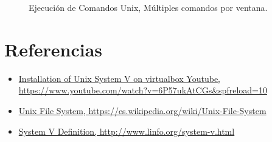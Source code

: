 \documentclass[paper=a4, fontsize=12pt]{article}        %
\numberwithin{equation}{section}                        %
\numberwithin{table}{section}                           %
\begin{document}
\begin{enumerate}
\begin{figure}[H]
{{        }}
       \hfill
    \caption{Ejecución de Comandos Unix, Múltiples comandos por ventana.}
\end{figure}

\end{enumerate}
\section{Referencias}
\begin{itemize}
\item  \hyperref[https://www.youtube.com/watch?v=6P57ukAtCGs&spfreload=10]{Installation of Unix System V on virtualbox Youtube,  https://www.youtube.com/watch?v=6P57ukAtCGs\&spfreload=10}
\item  \hyperref[https://es.wikipedia.org/wiki/Unix_File_System]{Unix File System,  https://es.wikipedia.org/wiki/Unix-File-System}
\item  \hyperref[http://www.linfo.org/system_v.html]{System V Definition, http://www.linfo.org/system-v.html}
\end{itemize}
\end{document}
